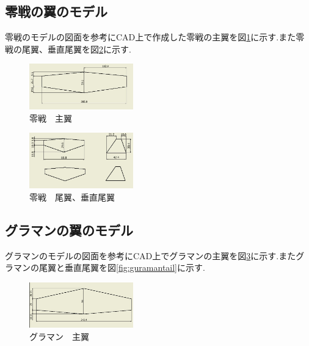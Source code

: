 \documentclass[twocolumn,11pt]{abst}
\begin{document}
\subsection{零戦の翼のモデル}
零戦のモデルの図面を参考にCAD上で作成した零戦の主翼を図\ref{fig:mainwing}に示す.また零戦の尾翼、垂直尾翼を図\ref{fig:tail}に示す.

\begin{figure}[htbp]
  \begin{center}
    \includegraphics[width=45mm]{mainwing.jpg}
    \end{center}
  \caption{零戦　主翼}
 \label{fig:mainwing}
\end{figure}

\begin{figure}[htbp]
  \begin{center}
    \includegraphics[width=45mm]{tail.jpg}
    \end{center}
  \caption{零戦　尾翼、垂直尾翼}
 \label{fig:tail}
\end{figure}


\subsection{グラマンの翼のモデル}
グラマンのモデルの図面を参考にCAD上でグラマンの主翼を図\ref{fig:guramanmainwing}に示す.またグラマンの尾翼と垂直尾翼を図\ref{fig:guramantail}に示す.


\begin{figure}[htbp]
  \begin{center}
    \includegraphics[width=45mm]{guramanmainwing.jpg}
    \end{center}
  \caption{グラマン　主翼}
 \label{fig:guramanmainwing}
\end{figure}
\end{document}

